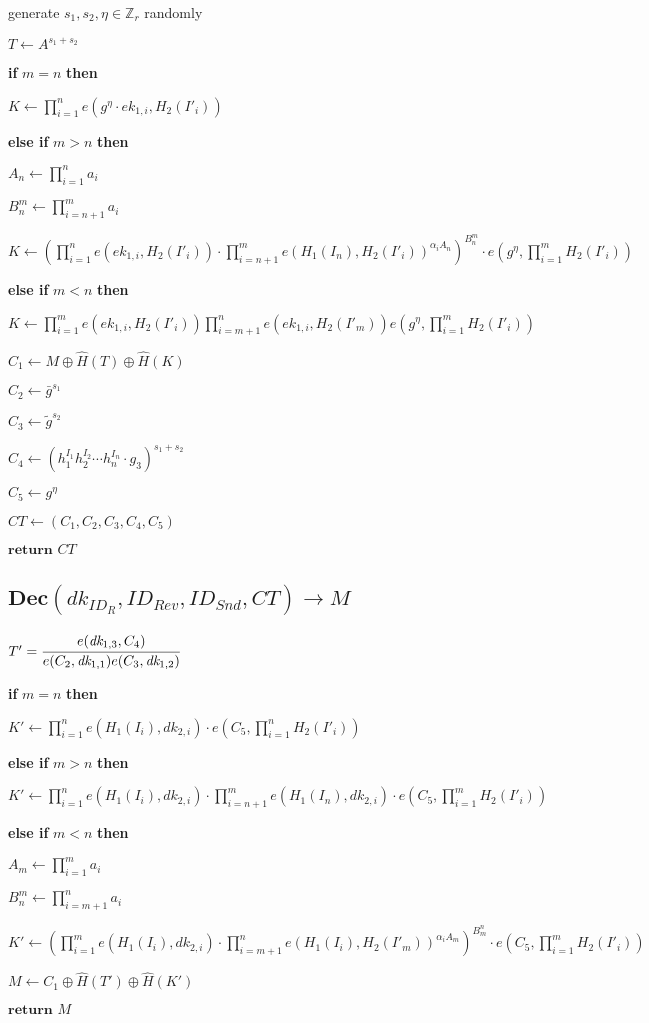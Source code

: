 \documentclass[a4paper]{article}
\begin{document}
generate $s_1, s_2, \eta \in \mathbb{Z}_r$ randomly

$T \gets A^{s_1 + s_2}$

\textbf{if} $m = n$ \textbf{then}

\quad$K \gets \prod_{i = 1}^n e(g^{\eta} \cdot \textit{ek}_{1, i}, H_2(I'_i))$

\textbf{else if} $m > n$ \textbf{then}

\quad$A_n \gets \prod\limits_{i = 1}^n a_i$

\quad$B_n^m \gets \prod\limits_{i = n + 1}^m a_i$

\quad$K \gets
(
\prod\limits_{i = 1}^n e(\textit{ek}_{1, i}, H_2(I'_i))
\cdot \prod\limits_{i = n + 1}^m e(H_1(I_n), H_2(I'_i))^{\alpha_i A_n}
)^{B_n^m}
\cdot e(g^{\eta}, \prod\limits_{i = 1}^m H_2(I'_i))
$

\textbf{else if} $m < n$ \textbf{then}

\quad$K \gets
\prod\limits_{i = 1}^m e(\textit{ek}_{1, i}, H_2(I'_i))
\prod\limits_{i = m + 1}^n e(\textit{ek}_{1, i}, H_2(I'_m))
e(g^{\eta}, \prod\limits_{i = 1}^m H_2(I'_i))
$

$C_1 \gets M \oplus \hat{H}(T) \oplus \hat{H}(K)$

$C_2 \gets \bar{g}^{s_1}$

$C_3 \gets \tilde{g}^{s_2}$

$C_4 \gets (h_1^{I_1} h_2^{I_2} \cdots h_n^{I_n} \cdot g_3)^{s_1 + s_2}$

$C_5 \gets g^{\eta}$

$\textit{CT} \gets (C_1, C_2, C_3, C_4, C_5)$

$\textbf{return }\textit{CT}$

\subsection{$\textbf{Dec}(\textit{dk}_{\textit{ID}_R}, \textit{ID}_\textit{Rev}, \textit{ID}_\textit{Snd}, \textit{CT}) \rightarrow M$}

$T' = \cfrac{e(\textit{dk}_{1, 3}, C_4)}{e(C_2, \textit{dk}_{1, 1})e(C_3, \textit{dk}_{1, 2})}$

\textbf{if} $m = n$ \textbf{then}

\quad$K' \gets
\prod\limits_{i = 1}^n e(H_1(I_i), \textit{dk}_{2, i}) 
\cdot e(C_5, \prod\limits_{i = 1}^n H_2(I'_i))
$

\textbf{else if} $m > n$ \textbf{then}

\quad$K' \gets
\prod\limits_{i = 1}^n e(H_1(I_i), \textit{dk}_{2, i})
\cdot \prod\limits_{i = n + 1}^m e(H_1(I_n), \textit{dk}_{2, i})
\cdot e(C_5, \prod\limits_{i = 1}^m H_2(I'_i))
$

\textbf{else if} $m < n$ \textbf{then}

\quad$A_m \gets \prod\limits_{i = 1}^m a_i$

\quad$B_n^m \gets \prod\limits_{i = m + 1}^n a_i$

\quad$K' \gets
(
\prod\limits_{i = 1}^m e(H_1(I_i), \textit{dk}_{2, i})
\cdot \prod\limits_{i = m + 1}^n e(H_1(I_i), H_2(I'_m))^{\alpha_i A_m}
)^{B_m^n}
\cdot e(C_5, \prod\limits_{i = 1}^m H_2(I'_i))
$

$M \gets C_1 \oplus \hat{H}(T') \oplus \hat{H}(K')$

$\textbf{return }M$
\end{document}
